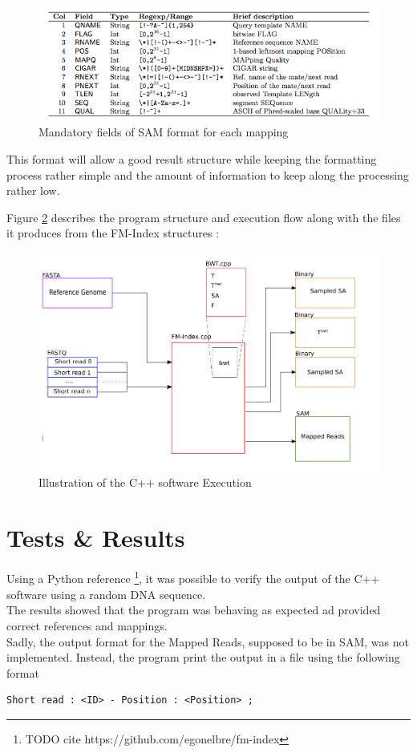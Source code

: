\begin{figure}[H]
    \centering
    \includegraphics[scale = 0.78]{Figures/SAMv1_3.png}
    \caption{Mandatory fields of SAM format for each mapping}
    \label{fig:samf}
\end{figure}
\vspace*{4mm}

This format will allow a good result structure while keeping the formatting process rather simple and the amount of information to keep along the processing rather low. 

Figure \ref{fig:cpp_workflow} describes the program structure and execution flow along with the files it produces from the FM-Index structures :

\begin{figure}[H]
    \centering
    \includegraphics[scale = 0.4]{Figures/cpp_workflow.png}
    \caption{Illustration of the C++ software Execution}
    \label{fig:cpp_workflow}
\end{figure}



\section{Tests \& Results}

Using a Python reference \footnote{TODO cite https://github.com/egonelbre/fm-index}, it was possible to verify the output of the C++ software using a random DNA sequence. \\

The results showed that the program was behaving as expected ad provided correct references and mappings. \\

Sadly, the output format for the Mapped Reads, supposed to be in SAM, was not implemented. Instead, the program print the output in a file using the following format 
\begin{verbatim}
Short read : <ID> - Position : <Position> ;
\end{verbatim}
